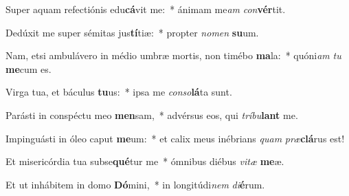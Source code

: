 \item Super aquam refectiónis edu\textbf{cá}vit me:~* ánimam me\textit{am} \textit{con}\textbf{vér}tit.
\item Dedúxit me super sémitas jus\textbf{tí}tiæ:~* propter \textit{no}\textit{men} \textbf{su}um.
\item Nam, etsi ambulávero in médio umbræ mortis, non timébo \textbf{ma}la:~* quóni\textit{am} \textit{tu} \textbf{me}cum es.
\item Virga tua, et báculus \textbf{tu}us:~* ipsa me \textit{con}\textit{so}\textbf{lá}ta sunt.
\item Parásti in conspéctu meo \textbf{men}sam,~* advérsus eos, qui \textit{trí}\textit{bu}\textbf{lant} me.
\item Impinguásti in óleo caput \textbf{me}um:~* et calix meus inébrians \textit{quam} \textit{præ}\textbf{clá}rus est!
\item Et misericórdia tua subse\textbf{qué}tur me~* ómnibus diébus \textit{vi}\textit{tæ} \textbf{me}æ.
\item Et ut inhábitem in domo \textbf{Dó}mini,~* in longitúdi\textit{nem} \textit{di}\textbf{é}rum.
